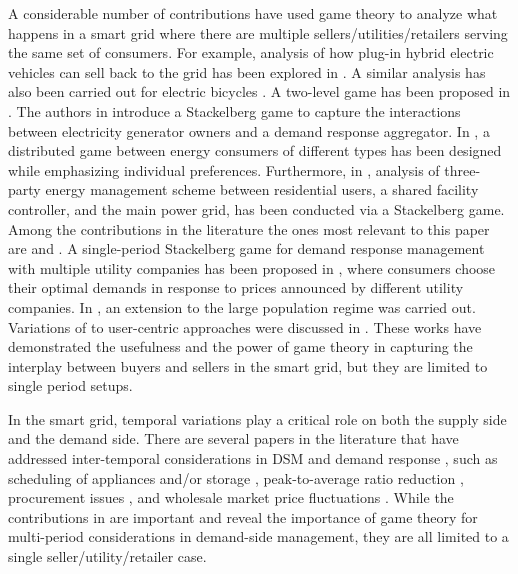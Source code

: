 {%

A considerable number of contributions have used game theory to analyze what happens in a smart grid where there are multiple sellers/utilities/retailers \cite{walidPHEV,trading,walidPHEV2,gao,twolevel,tansu,yaagoubi,tushar2,sabita,sabita2,sabita3,han} serving the same set of consumers. For example, analysis of how plug-in hybrid electric vehicles can sell back to the grid has been explored in \cite{walidPHEV,trading,walidPHEV2}. A similar analysis has also been carried out for electric bicycles \cite{gao}. A two-level game has been proposed in \cite{twolevel}. The authors in \cite{tansu} introduce a Stackelberg game to capture the interactions between electricity generator owners and a demand response aggregator. In \cite{yaagoubi}, a distributed game between energy consumers of different types has been designed while emphasizing individual preferences. Furthermore, in \cite{tushar2}, analysis of three-party energy management scheme between residential users, a shared facility controller, and the main power grid, has been conducted via a Stackelberg game. Among the contributions in the literature the ones most relevant to this paper are \cite{sabita} and \cite{sabita2}. A single-period Stackelberg game for demand response management with multiple utility companies has been proposed in \cite{sabita}, where consumers choose their optimal demands in response to prices announced by different utility companies. In \cite{sabita2}, an extension to the large population regime was carried out. Variations of \cite{sabita} to user-centric approaches were discussed in \cite{sabita3,han}. These works \cite{walidPHEV,trading,walidPHEV2,gao,twolevel,tansu,yaagoubi,tushar2,sabita,sabita2,sabita3,han} have demonstrated the usefulness and the power of game theory in capturing the interplay between buyers and sellers in the smart grid, but they are limited to single period setups.




In the smart grid, temporal variations play a critical role on both the supply side and the demand side. There are several papers in the literature that have addressed inter-temporal considerations in DSM and demand response \cite{amir,hazem,roh,zhudiff,PAR,collins,repeated,fourstage,dayahead,wei}, such as scheduling of appliances and/or storage \cite{amir,hazem,roh,zhudiff},  peak-to-average ratio reduction \cite{PAR,collins,repeated}, procurement issues \cite{fourstage}, and wholesale market price fluctuations \cite{dayahead,wei}. While the contributions in \cite{amir,hazem,roh,zhudiff,PAR,collins,repeated,fourstage,dayahead,wei} are important and reveal the importance of game theory for multi-period considerations in demand-side management, they are all limited to a single seller/utility/retailer case. 

}

